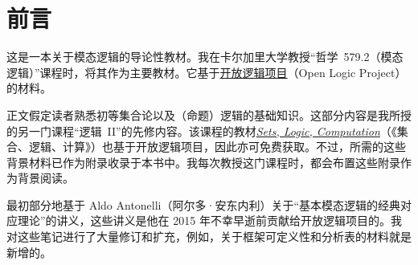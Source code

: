 
\chapter{前言}

这是一本关于模态逻辑的导论性教材。我在卡尔加里大学教授“哲学~579.2（模态逻辑）”课程时，将其作为主要教材。它基于\href{https://openlogicproject.org}{开放逻辑项目}（Open Logic Project）的材料。

正文假定读者熟悉初等集合论以及（命题）逻辑的基础知识。这部分内容是我所授的另一门课程“逻辑~II”的先修内容。该课程的教材\href{https://slc.openlogicproject.org}{\emph{Sets, Logic, Computation}}（《集合、逻辑、计算》）也基于开放逻辑项目，因此亦可免费获取。不过，所需的这些背景材料已作为附录收录于本书中。我每次教授这门课程时，都会布置这些附录作为背景阅读。

最初部分地基于 Aldo Antonelli（阿尔多·安东内利）关于“基本模态逻辑的经典对应理论”的讲义，这些讲义是他在 2015 年不幸早逝前贡献给开放逻辑项目的。我对这些笔记进行了大量修订和扩充，例如，关于框架可定义性和分析表的材料就是新增的。